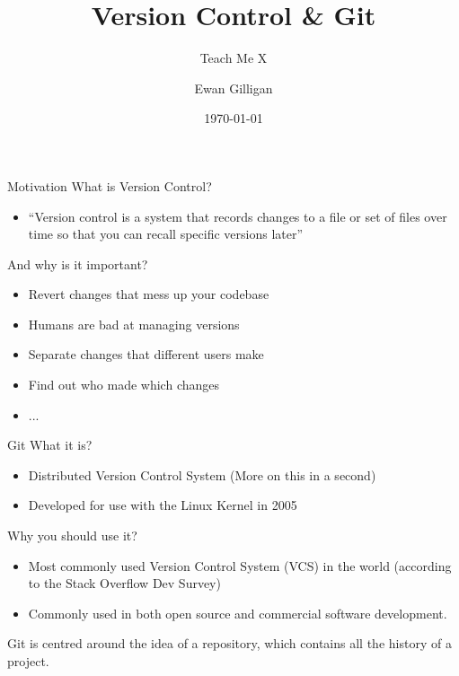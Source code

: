 \documentclass{beamer}
\title{Version Control \& Git}
\subtitle{Teach Me X}
\author{Ewan Gilligan}
\date{\today}
\begin{document}

\begin{frame}
	\maketitle %
\end{frame}

\begin{frame}{Motivation}
What is Version Control?
    \begin{itemize}
        \item ``Version control is a system that records changes to a file or set of files over time so that you can recall specific versions later'' \parencite{10.5555/2695634}
    \end{itemize}
And why is it important?
    \begin{itemize}
        \item Revert changes that mess up your codebase
        \item Humans are bad at managing versions
        \item Separate changes that different users make
        \item Find out who made which changes
        \item ...
    \end{itemize}
\end{frame}

\begin{frame}{Git}
What it is?
\begin{itemize}
    \item Distributed Version Control System (More on this in a second)
    \item Developed for use with the Linux Kernel in 2005
\end{itemize}
Why you should use it?
\begin{itemize}
    \item Most commonly used Version Control System (VCS) in the world (according to the Stack Overflow Dev Survey)
    \item Commonly used in both open source and commercial software development.
\end{itemize}
Git is centred around the idea of a repository, which contains all the history of a project.
    
\end{frame}
\end{document}
